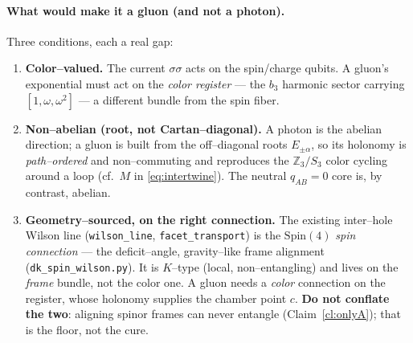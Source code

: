 \documentclass[11pt,oneside]{article}
\newcommand{\Z}{\mathbb{Z}}
\newcommand{\code}[1]{\texttt{#1}}
\newcommand{\Spin}{\mathrm{Spin}}
\theoremstyle{plain}
\begin{document}
\paragraph{What would make it a gluon (and not a photon).}
Three conditions, each a real gap:
\begin{enumerate}[leftmargin=2em]
  \item \textbf{Color--valued.} The current $\sigma\sigma$ acts on the spin/charge
        qubits. A gluon's exponential must act on the \emph{color register} --- the
        $b_3$ harmonic sector carrying $[1,\omega,\omega^2]$ --- a different
        bundle from the spin fiber.
  \item \textbf{Non--abelian (root, not Cartan--diagonal).} A photon is the
        abelian direction; a gluon is built from the off--diagonal roots
        $E_{\pm\alpha}$, so its holonomy is \emph{path--ordered} and
        non--commuting and reproduces the $\Z_3/S_3$ color cycling around a loop
        (cf.\ $M$ in \eqref{eq:intertwine}). The neutral $q_{AB}=0$ core is, by
        contrast, abelian.
  \item \textbf{Geometry--sourced, on the right connection.} The existing
        inter--hole Wilson line (\code{wilson\_line}, \code{facet\_transport}) is
        the $\Spin(4)$ \emph{spin connection} --- the deficit--angle, gravity--like
        frame alignment (\code{dk\_spin\_wilson.py}). It is $K$--type (local,
        non--entangling) and lives on the \emph{frame} bundle, not the color one.
        A gluon needs a \emph{color} connection on the register, whose holonomy
        supplies the chamber point $c$. \textbf{Do not conflate the two}: aligning
        spinor frames can never entangle (Claim~\ref{cl:onlyA}); that is the floor,
        not the cure.
\end{enumerate}
\end{document}

